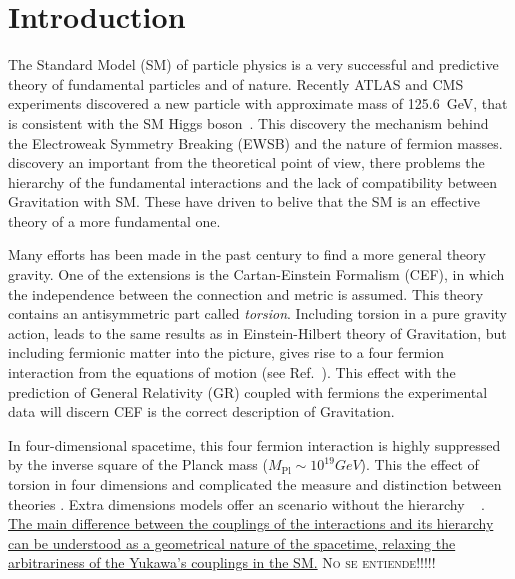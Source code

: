 \section{Introduction}

The Standard Model (SM) of particle physics\out{,} is a very successful and predictive theory of fundamental particles and   of nature. Recently ATLAS and CMS experiments discovered a new particle with approximate mass of \SI{125.6}{\GeV}, that is consistent with the SM Higgs boson~\cite{Aad:2012tfa,Chatrchyan:2012ufa}. This discovery   the mechanism behind the Electroweak Symmetry Breaking (EWSB) and the nature of fermion masses.   discovery   an important   from the theoretical point of view, there   problems   the hierarchy of the fundamental interactions and  the lack of compatibility between Gravitation with SM. These have driven  to belive that the SM is an effective theory of a more fundamental one.

Many efforts has been made in the past century %
to find a more general theory gravity. One of the extensions is the Cartan-Einstein Formalism (CEF),  in which the independence between the connection and metric  is assumed. This theory  contains an antisymmetric part called \textit{torsion}. Including torsion in a pure gravity action, leads to the same results as in Einstein-Hilbert theory of Gravitation, but including fermionic matter into the picture, gives rise to a four fermion interaction from the equations of motion (see Ref.~\cite{Hehl:1976kj}). This effect   with the prediction of General Relativity (GR) coupled with fermions  the experimental data will discern   CEF is the correct description of Gravitation.

In four-dimensional spacetime, this four fermion interaction is highly suppressed by the inverse square of the  Planck mass ($M_{\text{Pl}}\sim\si{10^{19}}{GeV}$). This    the effect of torsion  in four dimensions and complicated the measure and distinction between theories . Extra dimensions models  offer an scenario without the hierarchy ~\cite{Randall:1999ee,ArkaniHamed:1998rs} . \uline{The main difference between the couplings of the interactions and its hierarchy can be understood as a geometrical nature of the spacetime, relaxing the arbitrariness of the Yukawa's couplings in the SM.} \textsc{No se entiende!!!!!}

